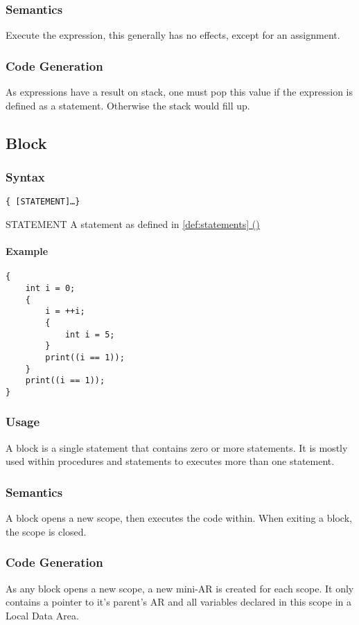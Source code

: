 \documentclass[twoside]{report}
\newcommand*{\fullref}[1]{\hyperref[{#1}]{\ref*{#1} (\nameref*{#1})}}
\newenvironment{mycompactdesc}{\begin{adjustwidth}{0.53cm}{}\begin{compactdesc}}{\end{compactdesc}\end{adjustwidth}}
\begin{document}
\subsubsection*{Semantics}
Execute the expression, this generally has no effects, except for an assignment.
\subsubsection*{Code Generation}
As expressions have a result on stack, one must pop this value if the expression is defined as a statement. Otherwise the stack would fill up.


\subsection{Block}
\label{def:block}
\subsubsection*{Syntax}
\texttt{\{ [STATEMENT]\ldots \}}
\begin{mycompactdesc}
	\item[STATEMENT] A statement as defined in \fullref{def:statements}
\end{mycompactdesc}
\paragraph{Example}
\begin{verbatim}
{
	int i = 0;
	{
		i = ++i;
		{
			int i = 5;
		}
		print((i == 1));
	}
	print((i == 1));
}
\end{verbatim}
\subsubsection*{Usage}
A block is a single statement that contains zero or more statements. It is mostly used within procedures and statements to executes more than one statement.
\subsubsection*{Semantics}
A block opens a new scope, then executes the code within. When exiting a block, the scope is closed.
\subsubsection*{Code Generation}
As any block opens a new scope, a new mini-AR is created for each scope. It only contains a pointer to it's parent's AR and all variables declared in this scope in a Local Data Area.
\end{document}
